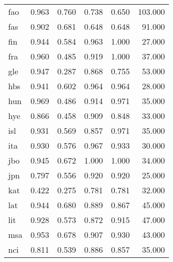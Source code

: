 \begin{table}[h]
\begin{tabular}{lrr|rr|r}
fao        &             0.963 &               0.760 &          0.738 &            0.650 &                     103.000 \\
fas        &             0.902 &               0.681 &          0.648 &            0.648 &                      91.000 \\
fin        &             0.944 &               0.584 &          0.963 &            1.000 &                      27.000 \\
fra        &             0.960 &               0.485 &          0.919 &            1.000 &                      37.000 \\
gle        &             0.947 &               0.287 &          0.868 &            0.755 &                      53.000 \\
hbs        &             0.941 &               0.602 &          0.964 &            0.964 &                      28.000 \\
hun        &             0.969 &               0.486 &          0.914 &            0.971 &                      35.000 \\
hye        &             0.866 &               0.458 &          0.909 &            0.848 &                      33.000 \\
isl        &             0.931 &               0.569 &          0.857 &            0.971 &                      35.000 \\
ita        &             0.930 &               0.576 &          0.967 &            0.933 &                      30.000 \\
jbo        &             0.945 &               0.672 &          1.000 &            1.000 &                      34.000 \\
jpn        &             0.797 &               0.556 &          0.920 &            0.920 &                      25.000 \\
kat        &             0.422 &               0.275 &          0.781 &            0.781 &                      32.000 \\
lat        &             0.944 &               0.680 &          0.889 &            0.867 &                      45.000 \\
lit        &             0.928 &               0.573 &          0.872 &            0.915 &                      47.000 \\
msa        &             0.953 &               0.678 &          0.907 &            0.930 &                      43.000 \\
nci        &             0.811 &               0.539 &          0.886 &            0.857 &                      35.000 \\

\end{tabular}
\end{table}
